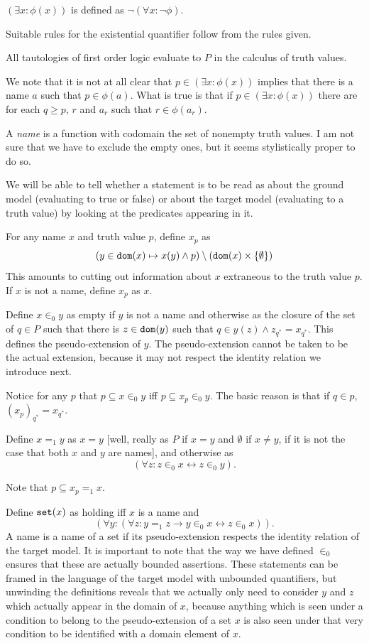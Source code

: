\documentclass[12pt]{article}
\begin{document}
$(\exists x:\phi(x))$ is defined as $\neg(\forall x:\neg \phi)$.

Suitable rules for the existential quantifier follow from the rules given.

All tautologies of first order logic evaluate to $P$ in the calculus of truth values.

We note that it is not at all clear that $p \in (\exists x:\phi(x))$ implies that there is a name $a$ such that $p \in \phi(a)$.  What is true is that if $p \in (\exists x:\phi(x))$ there are for each $q \geq p$, $r$ and $a_r$ such that $r \in \phi(a_r)$.

A {\em name\/} is a function with codomain the set of nonempty truth values.  I am not sure that we have to exclude the empty ones, but it seems stylistically proper to do so.

We will be able to tell whether a statement is to be read as about the ground model (evaluating to true or false) or about the target model (evaluating to a truth value) by looking at the predicates appearing in it.

For any name $x$ and truth value $p$, define $x_p$ as $$(y\in {\tt dom}(x) \mapsto x(y) \wedge p)\setminus ({\tt dom}(x) \times \{\emptyset\})$$  This amounts to cutting
out information about $x$ extraneous to the truth value $p$.  If $x$ is not a name, define $x_p$ as $x$.

Define $x \in_0 y$ as empty if $y$ is not a name and otherwise as the closure of the set of $q\in P$ such that there is $z\in {\tt dom}(y)$ such that $q \in y(z) \wedge z_{q^*}=x_{q^*}$.  This defines
the pseudo-extension of $y$.  The pseudo-extension cannot be taken to be the actual extension, because it may not respect the identity relation we introduce next.

Notice for any $p$ that $p \subseteq x \in_0 y$ iff $p \subseteq  x_p \in_0 y$.  The basic reason is that if $q \in p$, $(x_p)_{q^*}=x_{q^*}$.

Define $x =_1 y$ as $x=y$ [well, really as $P$ if $x=y$ and $\emptyset$ if $x \neq y$, if it is not the case that both $x$ and $y$ are names], and otherwise as $$(\forall z:z \in_0 x \leftrightarrow z \in_0 y).$$

Note that $p \subseteq  x_p =_1 x$.

Define ${\tt set}(x)$ as holding iff $x$ is a name and $$(\forall y:(\forall z:y=_1 z \rightarrow y \in_0x \leftrightarrow z\in_0 x)).$$  A name is a name of a set if its pseudo-extension respects the identity relation of the target model.  It is important to note that the way we have defined
$\in_0$ ensures that these are actually bounded assertions.  These statements can be framed in the language of the target model with unbounded quantifiers, but unwinding the definitions
reveals that we actually only need to consider $y$ and $z$ which actually appear in the domain of $x$, because anything which is seen under a condition to belong to the pseudo-extension of a set $x$ is also seen under that very condition to be identified with a domain element of $x$.
\end{document}
